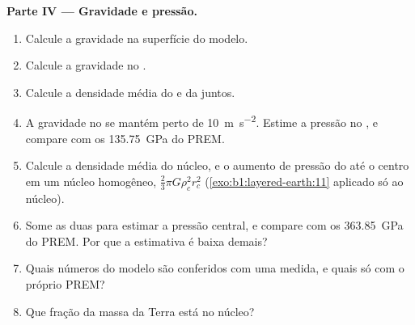 \begin{problem}
\noindent\textbf{Parte IV --- Gravidade e pressão.}
\begin{enumerate}[resume]
  \item Calcule a gravidade na superfície do modelo.
  \item Calcule a gravidade no .
  \item Calcule a densidade média do  e da  juntos.
  \item A gravidade no  se mantém perto de \qty{10}{m.s^{-2}}. Estime a pressão no , e compare com os \qty{135.75}{GPa} do PREM.
  \item Calcule a densidade média do núcleo, e o aumento de pressão do  até o centro em um núcleo homogêneo, $\tfrac23\pi G\rho_c^2 r_c^2$ (\cref{exo:b1:layered-earth:11} aplicado só ao núcleo).
  \item Some as duas para estimar a pressão central, e compare com os \qty{363.85}{GPa} do PREM. Por que a estimativa é baixa demais?
  \item Quais números do modelo são conferidos com uma medida, e quais só com o próprio PREM?
  \item Que fração da massa da Terra está no núcleo?
\end{enumerate}
\end{problem}
